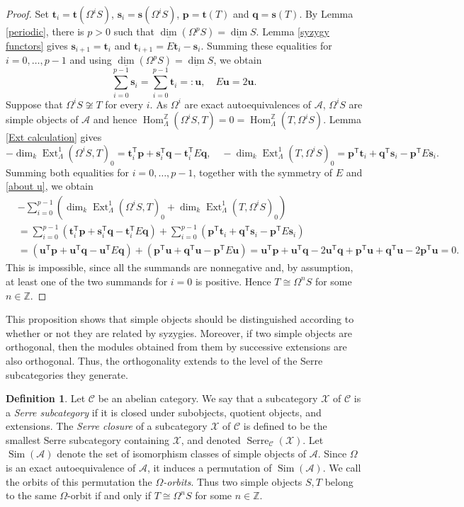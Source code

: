 \documentclass{amsart}
\theoremstyle{definition}
\newtheorem{dfn}[thm]{Definition}
\theoremstyle{remark}
\numberwithin{equation}{thm}
\def\A{\mathcal{A}}
\def\dimvec{\underline{\dim}}
\def\C{\mathcal{C}}
\def\dim{\operatorname{dim}}
\def\Ext{\operatorname{Ext}}
\def\gHom{\operatorname{Hom}^{\mathbb{Z}}}
\def\L{\Lambda}
\def\Serre{\operatorname{Serre}}
\def\T{\mathsf{T}}
\def\X{\mathcal{X}}
\def\Z{\mathbb{Z}}
\def\bfs{\mathbf{s}}
\def\bft{\mathbf{t}}
\def\bfp{\mathbf{p}}
\def\bfq{\mathbf{q}}
\def\bfu{\mathbf{u}}
\begin{document}
\begin{proof}
Set $\bft_i=\bft(\Omega^iS)$, $\bfs_i=\bfs(\Omega^iS)$, $\bfp=\bft(T)$ and $\bfq=\bfs(T)$.
By Lemma \ref{periodic}, there is $p>0$ such that $\dimvec(\Omega^pS)=\dimvec S$.
Lemma \ref{syzygy functors} gives $\bfs_{i+1}=\bft_i$ and $\bft_{i+1}=E\bft_i-\bfs_i$.
Summing these equalities for $i=0,\ldots,p-1$ and using $\dimvec(\Omega^pS)=\dimvec S$, we obtain
\begin{equation}\label{about u}
\sum_{i=0}^{p-1}\bfs_i=\sum_{i=0}^{p-1}\bft_i=:\bfu, \quad E\bfu=2\bfu. 
\end{equation}
Suppose that $\Omega^i S\not\cong T$ for every $i$.
As $\Omega^i$ are exact autoequivalences of $\A$, $\Omega^i S$ are simple objects of $\A$ and hence $\gHom_\L(\Omega^iS,T)=0=\gHom_\L(T,\Omega^iS)$.
Lemma \ref{Ext calculation} gives
$$
-\dim_k\Ext_\L^1(\Omega^iS,T)_0=\bft_i^{\T}\bfp+\bfs_i^{\T}\bfq-\bft_i^{\T}E\bfq, \quad
-\dim_k\Ext_\L^1(T, \Omega^iS)_0=\bfp^{\T}\bft_i+\bfq^{\T}\bfs_i-\bfp^{\T}E\bfs_i.
$$
Summing both equalities for $i=0,\ldots,p-1$, together with the symmetry of $E$ and \eqref{about u}, we obtain
\begin{align*}
&-\sum_{i=0}^{p-1}\left(\dim_k\Ext_\L^1(\Omega^iS,T)_0+\dim_k\Ext_\L^1(T,\Omega^iS)_0
\right)\\
&=\sum_{i=0}^{p-1} \left(\bft_i^{\T}\bfp+\bfs_i^{\T}\bfq-\bft_i^{\T}E\bfq\right) +\sum_{i=0}^{p-1}\left(\bfp^{\T}\bft_i+\bfq^{\T}\bfs_i-\bfp^{\T}E\bfs_i\right)\\
&=(\bfu^{\T}\bfp+\bfu^{\T}\bfq-\bfu^{\T}E\bfq)+(\bfp^{\T}\bfu+\bfq^{\T}\bfu-\bfp^{\T}E\bfu)=\bfu^{\T}\bfp+\bfu^{\T}\bfq-2\bfu^{\T}\bfq+\bfp^{\T}\bfu+\bfq^{\T}\bfu-2\bfp^{\T}\bfu=0.
\end{align*}
This is impossible, since all the summands are nonnegative and, by assumption, at least one of the two summands for $i=0$ is positive. Hence $T\cong\Omega^nS$ for some $n\in\Z$.
\end{proof}

This proposition shows that simple objects should be distinguished according to whether or not they are related by syzygies.
Moreover, if two simple objects are orthogonal, then the modules obtained from them by successive extensions are also orthogonal. Thus, the orthogonality extends to the level of the Serre subcategories they generate.

\begin{dfn}
Let $\C$ be an abelian category.
We say that a subcategory $\X$ of $\C$ is a {\em Serre subcategory} if it is closed under subobjects, quotient objects, and extensions.
The \textit{Serre closure} of a subcategory $\X$ of $\C$ is defined to be the smallest Serre subcategory containing $\X$, and denoted $\Serre_{\C}(\X)$.
Let $\operatorname{Sim}(\A)$ denote the set of isomorphism classes of simple objects of $\A$. Since $\Omega$ is an exact autoequivalence of $\A$, it induces a permutation of $\operatorname{Sim}(\A)$. We call the orbits of this permutation the \textit{$\Omega$-orbits}. Thus two simple objects $S,T$ belong to the same $\Omega$-orbit if and only if $T\cong\Omega^nS$ for some $n\in\mathbb Z$.
\end{dfn}
\end{document}
